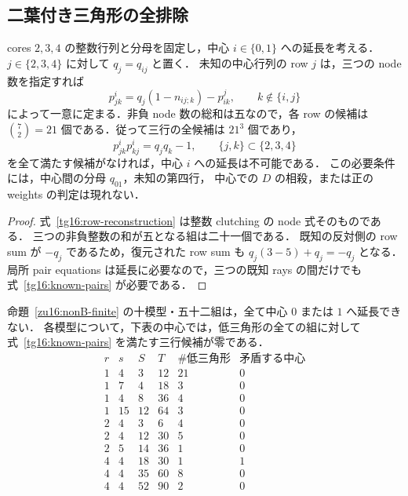 \subsection{二葉付き三角形の全排除}
\label{tg16:section}

\begin{lemma}[中心の既知三行の有限復元]
\label{tg16:known-rows}
cores $2,3,4$ の整数行列と分母を固定し，中心 $i\in\{0,1\}$ への延長を考える．
$j\in\{2,3,4\}$ に対して $q_j=q_{ij}$ と置く．
未知の中心行列の row $j$ は，三つの node 数を指定すれば
\begin{equation}\label{tg16:row-reconstruction}
 p^i_{jk}=q_j(1-n_{ij;k})-p^j_{ik},
 \qquad k\notin\{i,j\}
\end{equation}
によって一意に定まる．非負 node 数の総和は五なので，各 row の候補は
$\binom{7}{2}=21$ 個である．従って三行の全候補は $21^3$ 個であり，
\begin{equation}\label{tg16:known-pairs}
 p^i_{jk}p^i_{kj}=q_jq_k-1,\qquad
 \{j,k\}\subset\{2,3,4\}
\end{equation}
を全て満たす候補がなければ，中心 $i$ への延長は不可能である．
この必要条件には，中心間の分母 $q_{01}$，未知の第四行，
中心での $D$ の相殺，または正の weights の判定は現れない．
\end{lemma}

\begin{proof}
式~\eqref{tg16:row-reconstruction} は整数 clutching の node 式そのものである．
三つの非負整数の和が五となる組は二十一個である．
既知の反対側の row sum が $-q_j$ であるため，復元された row sum も
$q_j(3-5)+q_j=-q_j$ となる．
局所 pair equations は延長に必要なので，三つの既知 rays の間だけでも
式~\eqref{tg16:known-pairs} が必要である．
\end{proof}

\begin{proposition}[十模型の中心延長障害]
\label{tg16:finite-obstruction}
命題~\ref{zu16:nonB-finite} の十模型・五十二組は，全て中心 $0$ または $1$ へ延長できない．
各模型について，下表の中心では，低三角形の全ての組に対して
式~\eqref{tg16:known-pairs} を満たす三行候補が零である．
\[
\begin{array}{rrrr|r|c}
r&s&S&T&\#\text{低三角形}&\text{矛盾する中心}\\\hline
1&4&3&12&21&0\\
1&7&4&18&3&0\\
1&4&8&36&4&0\\
1&15&12&64&3&0\\
2&4&3&6&4&0\\
2&4&12&30&5&0\\
2&5&14&36&1&0\\
4&4&18&30&1&1\\
4&4&35&60&8&0\\
4&4&52&90&2&0
\end{array}
\]
\end{proposition}

